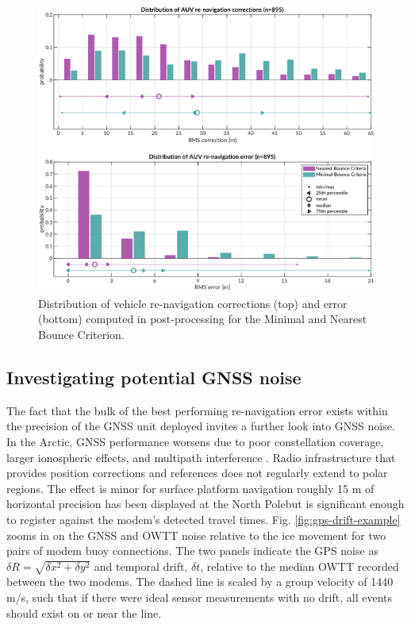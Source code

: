 \begin{figure}[!ht]
\includegraphics[width=\textwidth]{figs/auv-trilat-stat.pdf}
\caption{Distribution of vehicle re-navigation corrections (top) and error (bottom) computed in post-processing for the Minimal and Nearest Bounce Criterion.}
\label{fig:trilat-auv}
\end{figure}

\subsection{Investigating potential GNSS noise}

The fact that the bulk of the best performing re-navigation error exists within the precision of the GNSS unit deployed invites a further look into GNSS noise.
In the Arctic, GNSS performance worsens due to poor constellation coverage, larger ionospheric effects, and multipath interference \citep{NAP12914,swanlund_gps_2016,Themens2015,Gwal2011,Jung2018,Reid2016}.
Radio infrastructure that provides position corrections and references does not regularly extend to polar regions.
The effect is minor for surface platform navigation \textemdash roughly 15 m of horizontal precision has been displayed at the North Pole\textemdash but is significant enough to register against the modem's detected travel times.
Fig. \ref{fig:gps-drift-example} zooms in on the GNSS and OWTT noise relative to the ice movement for two pairs of modem buoy connections.
The two panels indicate the GPS noise as $\delta R = \sqrt{\delta x^2 + \delta y^2}$ and temporal drift, $\delta t$, relative to the median OWTT recorded between the two modems.
The dashed line is scaled by a group velocity of 1440 m/s, such that if there were ideal sensor measurements with no drift, all events should exist on or near the line.

